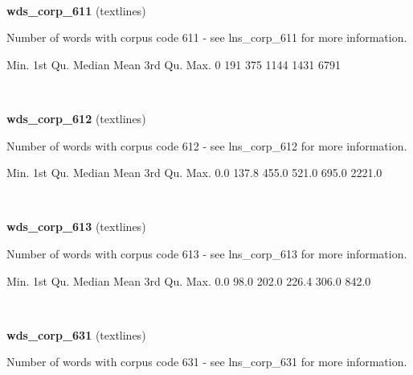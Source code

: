\documentclass[]{article}
\newenvironment{Shaded}{\begin{snugshade}}{\end{snugshade}}
\newcommand{\DecValTok}[1]{\textcolor[rgb]{0.00,0.00,0.81}{{#1}}}
\newcommand{\FloatTok}[1]{\textcolor[rgb]{0.00,0.00,0.81}{{#1}}}
\newcommand{\NormalTok}[1]{{#1}}
\begin{document}
~

\vspace{1em}

\textbf{wds\_corp\_611} (textlines)

Number of words with corpus code 611 - see lns\_corp\_611 for more
information.

\begin{Shaded}
\begin{Highlighting}[]
   \NormalTok{Min. 1st Qu.  Median    Mean 3rd Qu.    Max. }
      \DecValTok{0}     \DecValTok{191}     \DecValTok{375}    \DecValTok{1144}    \DecValTok{1431}    \DecValTok{6791} 
\end{Highlighting}
\end{Shaded}

~

\vspace{1em}

\textbf{wds\_corp\_612} (textlines)

Number of words with corpus code 612 - see lns\_corp\_612 for more
information.

\begin{Shaded}
\begin{Highlighting}[]
   \NormalTok{Min. 1st Qu.  Median    Mean 3rd Qu.    Max. }
    \FloatTok{0.0}   \FloatTok{137.8}   \FloatTok{455.0}   \FloatTok{521.0}   \FloatTok{695.0}  \FloatTok{2221.0} 
\end{Highlighting}
\end{Shaded}

~

\vspace{1em}

\textbf{wds\_corp\_613} (textlines)

Number of words with corpus code 613 - see lns\_corp\_613 for more
information.

\begin{Shaded}
\begin{Highlighting}[]
   \NormalTok{Min. 1st Qu.  Median    Mean 3rd Qu.    Max. }
    \FloatTok{0.0}    \FloatTok{98.0}   \FloatTok{202.0}   \FloatTok{226.4}   \FloatTok{306.0}   \FloatTok{842.0} 
\end{Highlighting}
\end{Shaded}

~

\vspace{1em}

\textbf{wds\_corp\_631} (textlines)

Number of words with corpus code 631 - see lns\_corp\_631 for more
information.
\end{document}
